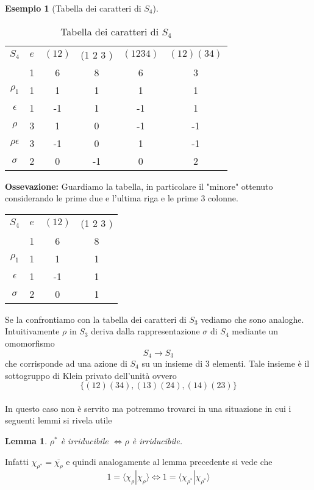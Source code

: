 \documentclass[11pt]{article}
\theoremstyle{plain}
\newtheorem{lemma}[thm]{Lemma}
\theoremstyle{definition}
\newtheorem{exmp}{Esempio}[section]
\theoremstyle{remark}
\begin{document}
\begin{exmp}[Tabella dei caratteri di $S_4$]
\begin{table}[!ht] 
\centering
\begin{tabular}{|c|c|c|c|c|c|}
\hline
$S_4$  & $e$ & $(1 2)$ & (1 2 3 ) & $(1 2 3 4)$ & $(1 2)(3 4)$ \\
 & 1 & 6 & 8 & 6 & 3 \\
\hline
 $\rho_1$ & 1 & 1  & 1 & 1 & 1\\
\hline
$\epsilon$ & 1  & -1 & 1 & -1 & 1 \\
\hline
$\rho$& 3 & 1 & 0 & -1 & -1\\
\hline
$\rho\epsilon$& 3 & -1 & 0 & 1 & -1\\
\hline
 $\sigma$& 2&  0 & -1& 0 & 2\\
\hline
\end{tabular}
\caption{Tabella dei caratteri di $S_4$}
\label{tabella caratteri s4}
\end{table}


\textbf{Ossevazione:} Guardiamo la tabella, in particolare il "minore" ottenuto considerando le prime due e l'ultima riga e le prime 3 colonne. 

\begin{table}[!ht]
\centering
\begin{tabular}{|c|c|c|c|}
\hline
$S_4$  & $e$ & $(1 2)$ & (1 2 3 )    \\
 & 1 & 6 & 8 \\
\hline
 $\rho_1$ & 1 & 1  & 1 \\
\hline
$\epsilon$ & 1 & -1 & 1 \\
\hline
$\sigma$ & 2 & 0 & 1 \\
\hline
\end{tabular}
\end{table}
Se la confrontiamo con la tabella dei caratteri di $S_3$ vediamo che sono analoghe. Intuitivamente $\rho$ in $S_3$ deriva dalla rappresentazione $\sigma$ di $S_4$ mediante un omomorfismo 
\[
S_4\rightarrow S_3
\]
che corrisponde ad una azione di $S_4$ su un insieme di 3 elementi. Tale insieme è il sottogruppo di Klein privato dell'unità ovvero
\[
\{ (12)(34),(13)(24),(14)(23)\}
\]
\\
In questo caso non è servito ma potremmo trovarci in una situazione in cui i seguenti lemmi si rivela utile
\begin{lemma}
$\rho^* $ è irriducibile $ \Leftrightarrow \rho$ è irriducibile.
\end{lemma}
Infatti $\chi_{\rho^*}=\overline{\chi_\rho} $ e quindi analogamente al lemma precedente si vede che
\[
1=\langle\chi_{\rho}|\chi_{\rho}\rangle \Leftrightarrow 1=\langle\chi_{\rho^*}|\chi_{\rho^*}\rangle
\]


\end{exmp}
\end{document}
